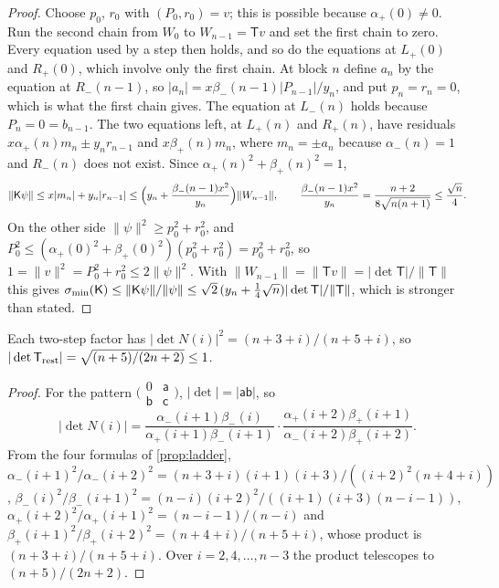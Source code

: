 \begin{proof}
Choose $p_0$, $r_0$ with $(P_0,r_0)=v$; this is possible because $\alpha_+(0)\ne0$. Run the
second chain from $W_0$ to $W_{n-1}=\mathsf Tv$ and set the first chain to zero. Every
equation used by a step then holds, and so do the equations at $L_+(0)$ and $R_+(0)$,
which involve only the first chain. At block $n$ define $a_n$ by the equation at
$R_-(n-1)$, so $|a_n|=x\beta_-(n-1)|P_{n-1}|/y_n$, and put $p_n=r_n=0$, which is what the
first chain gives. The equation at $L_-(n)$ holds because $P_n=0=b_{n-1}$. The two
equations left, at $L_+(n)$ and $R_+(n)$, have residuals
$x\alpha_+(n)m_n\pm y_nr_{n-1}$ and $x\beta_+(n)m_n$, where $m_n=\pm a_n$ because
$\alpha_-(n)=1$ and $R_-(n)$ does not exist. Since $\alpha_+(n)^2+\beta_+(n)^2=1$,
\[
  \|\mathsf K\psi\|\le x|m_n|+y_n|r_{n-1}|\le\Bigl(y_n+\frac{\beta_-(n-1)x^2}{y_n}\Bigr)\|W_{n-1}\|,
  \qquad \frac{\beta_-(n-1)x^2}{y_n}=\frac{n+2}{8\sqrt{n(n+1)}}\le\frac{\sqrt n}4 .
\]
On the other side $\|\psi\|^2\ge p_0^2+r_0^2$, and $P_0^2\le(\alpha_+(0)^2+\beta_+(0)^2)(p_0^2+r_0^2)
=p_0^2+r_0^2$, so $1=\|v\|^2=P_0^2+r_0^2\le2\|\psi\|^2$. With $\|W_{n-1}\|=\|\mathsf Tv\|=
|\det\mathsf T|/\|\mathsf T\|$ this gives $\sigma_{\min}(\mathsf K)\le\|\mathsf K\psi\|/\|\psi\|\le\sqrt2\,(y_n+\frac14
\sqrt n)|\det\mathsf T|/\|\mathsf T\|$, which is stronger than stated.
\end{proof}

\begin{lemma}[Determinant]\label{lem:v6det}
Each two-step factor has $|\det N(i)|^2=(n+3+i)/(n+5+i)$, so
$|\det\mathsf T_{\rm rest}|=\sqrt{(n+5)/(2n+2)}\le1$.
\end{lemma}

\begin{proof}
For the pattern $\bigl(\begin{smallmatrix}0&\mathsf a\\\mathsf b&\mathsf c\end{smallmatrix}\bigr)$,
$|\det|=|\mathsf a\mathsf b|$, so
\[
  |\det N(i)|=\frac{\alpha_-(i+1)\beta_-(i)}{\alpha_+(i+1)\beta_-(i+1)}\cdot
  \frac{\alpha_+(i+2)\beta_+(i+1)}{\alpha_-(i+2)\beta_+(i+2)} .
\]
From the four formulas of \cref{prop:ladder},
$\alpha_-(i+1)^2/\alpha_-(i+2)^2=(n+3+i)(i+1)(i+3)/((i+2)^2(n+4+i))$,
$\beta_-(i)^2/\beta_-(i+1)^2=(n-i)(i+2)^2/((i+1)(i+3)(n-i-1))$,
$\alpha_+(i+2)^2/\alpha_+(i+1)^2=(n-i-1)/(n-i)$ and
$\beta_+(i+1)^2/\beta_+(i+2)^2=(n+4+i)/(n+5+i)$, whose product is $(n+3+i)/(n+5+i)$. Over
$i=2,4,\dots,n-3$ the product telescopes to $(n+5)/(2n+2)$.
\end{proof}

